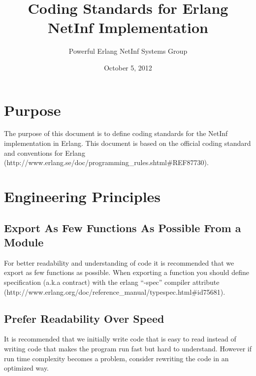 \documentclass[12pt]{article}
\title{Coding Standards for Erlang NetInf Implementation}			%
\author{Powerful Erlang NetInf Systems Group }		%
\date{October 5, 2012}					%
\begin{document}
\maketitle					%



\section{Purpose}
The purpose of this document is to define coding standards for the NetInf implementation in Erlang. This document is based on the official coding standard and conventions for Erlang (http://www.erlang.se/doc/programming\_rules.shtml\#REF87730). 

\section{Engineering Principles}
\subsection{Export As Few Functions As Possible From a Module}
For better readability and understanding of code it is recommended that we export as few functions as possible. When exporting a function you should define specification (a.k.a contract) with the erlang “-spec” compiler attribute (http://www.erlang.org/doc/reference\_manual/typespec.html\#id75681). 

\subsection{Prefer Readability Over Speed}
It is recommended that we initially write code that is easy to read instead of writing code that makes the program run fast but hard to understand. However if run time complexity becomes a problem, consider rewriting the code in an optimized way. 
\end{document}
